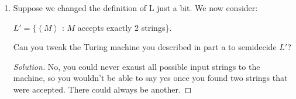 \documentclass[10pt]{article}
\newcommand{\brackets}[1]{\left< #1 \right>}
\begin{document}
\begin{enumerate}[1)]
\begin{enumerate}
\item
Suppose we changed the definition of L just a bit.  We now consider:
\begin{center}
$L' = \{\brackets{M}$ : $M$ accepts exactly 2 strings\}.
\end{center}
Can you tweak the Turing machine you described in part a to semidecide $L'$?
\begin{proof}[Solution]
No, you could never exaust all possible input strings to the machine, so you wouldn't be able to say yes once you found two strings that were accepted.  There could always be another.
\end{proof}
\end{enumerate}
\end{enumerate}
\end{document}
